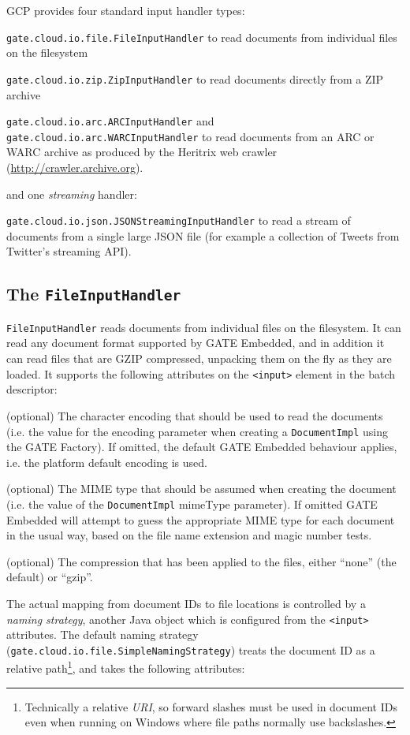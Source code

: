 GCP provides four standard input handler types:

\bit
\item \verb!gate.cloud.io.file.FileInputHandler! to read documents from
  individual files on the filesystem
\item \verb!gate.cloud.io.zip.ZipInputHandler! to read documents directly from
  a ZIP archive
\item \verb!gate.cloud.io.arc.ARCInputHandler! and
  \verb!gate.cloud.io.arc.WARCInputHandler! to read documents from an ARC or
  WARC archive as produced by the Heritrix web crawler
  (\url{http://crawler.archive.org}).
\eit

and one \emph{streaming} handler:

\bit
\item \verb!gate.cloud.io.json.JSONStreamingInputHandler! to read a stream of
  documents from a single large JSON file (for example a collection of Tweets
  from Twitter's streaming API).
\eit

\subsection{The {\tt FileInputHandler}}

\verb!FileInputHandler! reads documents from individual files on the
filesystem.  It can read any document format supported by GATE Embedded, and in
addition it can read files that are GZIP compressed, unpacking them on the fly
as they are loaded.  It supports the following attributes on the \verb!<input>!
element in the batch descriptor:

\bde
\item[encoding] (optional) The character encoding that should be used to read
  the documents (i.e. the value for the encoding parameter when creating a
  \verb!DocumentImpl! using the GATE Factory).  If omitted, the default GATE
  Embedded behaviour applies, i.e. the platform default encoding is used.
\item[mimeType] (optional) The MIME type that should be assumed when creating
  the document (i.e. the value of the \verb!DocumentImpl! mimeType parameter).
  If omitted GATE Embedded will attempt to guess the appropriate MIME type for
  each document in the usual way, based on the file name extension and magic
  number tests.
\item[compression] (optional) The compression that has been applied to the
  files, either ``none'' (the default) or ``gzip''.
\ede

The actual mapping from document IDs to file locations is controlled by a
{\em naming strategy}, another Java object which is configured from the
\verb!<input>! attributes.  The default naming strategy
({\tt gate.cloud.io.file.SimpleNamingStrategy}) treats the document ID as a
relative path\footnote{Technically a relative {\em URI}, so forward slashes
must be used in document IDs even when running on Windows where file paths
normally use backslashes.}, and takes the following attributes:

